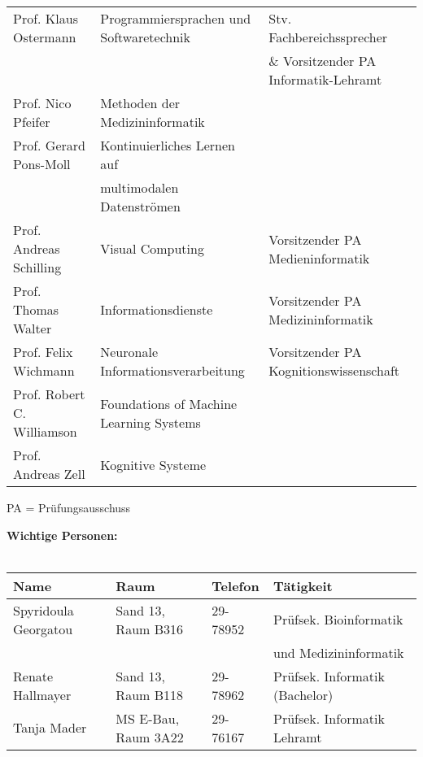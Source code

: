 \begin{tabular}{|lll|}
	Prof. Klaus Ostermann            & Programmiersprachen und Softwaretechnik               & Stv. Fachbereichssprecher                \\
	                                 &                                                       & \& Vorsitzender PA Informatik-Lehramt    \\
	Prof. Nico Pfeifer               & Methoden der Medizininformatik                        &                                          \\
	Prof. Gerard Pons-Moll           & Kontinuierliches Lernen auf                           &                                          \\
	                                 & multimodalen Datenströmen                             &                                          \\
	Prof. Andreas Schilling          & Visual Computing                                      & Vorsitzender PA Medieninformatik         \\
	Prof. Thomas Walter              & Informationsdienste                                   & Vorsitzender PA Medizininformatik        \\
	Prof. Felix Wichmann             & Neuronale Informationsverarbeitung                    & Vorsitzender PA Kognitionswissenschaft   \\
	Prof. Robert C. Williamson       & Foundations of Machine Learning Systems               &                                          \\
	Prof. Andreas Zell               & Kognitive Systeme                                     &                                          \\
	\hline
\end{tabular}
\scriptsize{PA = Prüfungsausschuss}


\textbf{Wichtige Personen:}\\\\
\begin{tabular}{|llll|}
	\hline
	Name								 & Raum                & Telefon  & Tätigkeit \hfill               \\
	\hline
	\hline
	Spyridoula Georgatou & Sand 13, Raum B316  & 29-78952 & Prüfsek. Bioinformatik         \\
											 &                     &          & und Medizininformatik          \\
	Renate Hallmayer		 & Sand 13, Raum B118  & 29-78962 & Prüfsek. Informatik (Bachelor) \\
	Tanja Mader					 & MS E-Bau, Raum 3A22 & 29-76167 & Prüfsek. Informatik Lehramt    \\
	\hline
\end{tabular} \\

